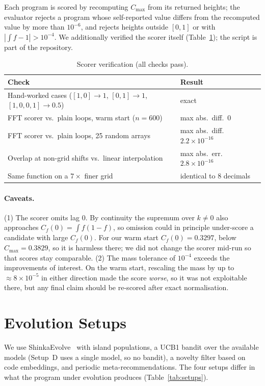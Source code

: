 \documentclass[11pt]{article}
\newcommand{\Cmax}{C_{\max}}
\begin{document}
Each program is scored by recomputing $\Cmax$ from its returned heights; the
evaluator rejects a program whose self-reported value differs from the
recomputed value by more than $10^{-6}$, and rejects heights outside $[0,1]$
or with $|\int f - 1|>10^{-4}$. We additionally verified the scorer itself
(Table~\ref{tab:verify}); the script is part of the repository.

\begin{table}[h]
\centering
\caption{Scorer verification (all checks pass).}
\label{tab:verify}
\begin{tabular}{p{9.2cm}l}
\toprule
Check & Result \\
\midrule
Hand-worked cases ($[1,0]\to1$, $[0,1]\to1$, $[1,0,0,1]\to0.5$) & exact \\
FFT scorer vs.\ plain loops, warm start ($n=600$) & max abs.\ diff.\ $0$ \\
FFT scorer vs.\ plain loops, 25 random arrays & max abs.\ diff.\ $2.2\times10^{-16}$ \\
Overlap at non-grid shifts vs.\ linear interpolation & max abs.\ err.\ $2.8\times10^{-16}$ \\
Same function on a $7\times$ finer grid & identical to 8 decimals \\
\bottomrule
\end{tabular}
\end{table}

\paragraph{Caveats.}
(1) The scorer omits lag $0$. By continuity the supremum over $k\neq0$ also
approaches $C_f(0)=\int f(1-f)$, so omission could in principle under-score a
candidate with large $C_f(0)$. For our warm start $C_f(0)=0.3297$, below
$\Cmax=0.3829$, so it is harmless there; we did not change the scorer mid-run
so that scores stay comparable. (2) The mass tolerance of $10^{-4}$ exceeds
the improvements of interest. On the warm start, rescaling the mass by up to
$\approx8\times10^{-5}$ in either direction made the score \emph{worse}, so it
was not exploitable there, but any final claim should be re-scored after exact
normalisation.

\section{Evolution Setups}

We use ShinkaEvolve~\cite{shinka} with island populations, a UCB1 bandit over
the available models (Setup~D uses a single model, so no bandit), a novelty
filter based on code embeddings, and periodic meta-recommendations. The four
setups differ in what the program under evolution produces
(Table~\ref{tab:setups}).
\end{document}
